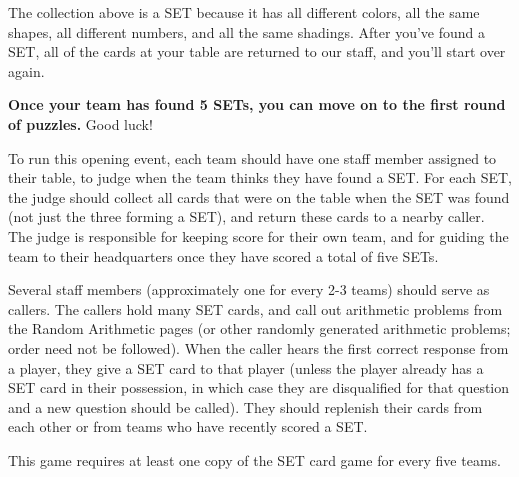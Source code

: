   The collection above is a SET because it has all different colors,
  all the same shapes, all different numbers, and all the same shadings.
  After you've found a SET, all of the cards at your table are returned
  to our staff, and you'll start over again.

  \textbf{Once your team has found 5 SETs, you can move on to the
  first round of puzzles.} Good luck!



\begin{multicols}{4}
\begin{itemize}
  
\end{itemize}
\end{multicols}



To run this opening event, each team should have one staff member assigned
to their table, to judge when the team thinks they have found a SET.
For each SET, the judge should collect all cards that were on the table when
the SET was found (not just the three forming a SET), and return these cards
to a nearby caller. The judge is responsible for keeping score for their own
team, and for guiding the team to their headquarters once they have scored
a total of five SETs.

Several staff members (approximately one for every 2-3 teams) should serve as
callers. The callers hold many SET cards, and call out arithmetic problems
from the Random Arithmetic pages (or other randomly generated arithmetic
problems; order need not be followed).
When the caller hears the first correct response from a player, they give a
SET card to that player (unless the player already has a SET card in their
possession, in which case they are disqualified for that question and a new
question should be called). They should replenish their cards from each other
or from teams who have recently scored a SET.

This game requires at least one copy of the SET card game for every five
teams.
